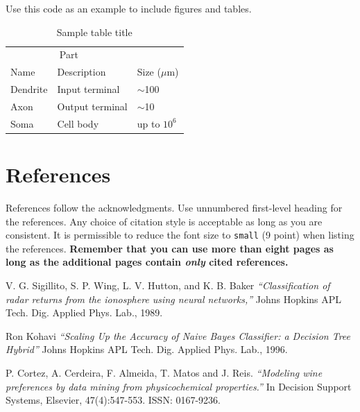 \documentclass{article}
\begin{document}
Use this code as an example to include figures and tables.

\begin{table}
  \caption{Sample table title}
  \label{sample-table}
  \centering
  \begin{tabular}{lll}
    \toprule
    \multicolumn{2}{c}{Part}                   \\
    \cmidrule(r){1-2}
    Name     & Description     & Size ($\mu$m) \\
    \midrule
    Dendrite & Input terminal  & $\sim$100     \\
    Axon     & Output terminal & $\sim$10      \\
    Soma     & Cell body       & up to $10^6$  \\
    \bottomrule
  \end{tabular}
\end{table}

\section*{References}

References follow the acknowledgments. Use unnumbered first-level heading for
the references. Any choice of citation style is acceptable as long as you are
consistent. It is permissible to reduce the font size to \verb+small+ (9 point)
when listing the references. {\bf Remember that you can use more than eight
  pages as long as the additional pages contain \emph{only} cited references.}
\medskip

\small

\begin{thebibliography}{9}
V. G. Sigillito, S. P. Wing, L. V. Hutton, and K. B.
Baker 
\textit{ “Classification of radar returns from the
ionosphere using neural networks,”} 
 Johns Hopkins APL Tech. Dig. Applied Phys. Lab., 1989. 
 
Ron Kohavi
\textit{ “Scaling Up the Accuracy of Naive Bayes Classifier: a Decision Tree Hybrid”} 
 Johns Hopkins APL Tech. Dig. Applied Phys. Lab., 1996. 

 P. Cortez, A. Cerdeira, F. Almeida, T. Matos and J. Reis. 
\textit{ “Modeling wine preferences by data mining from physicochemical properties.”} 
In Decision Support Systems, Elsevier, 47(4):547-553. ISSN: 0167-9236.

\end{thebibliography}

\end{document}
